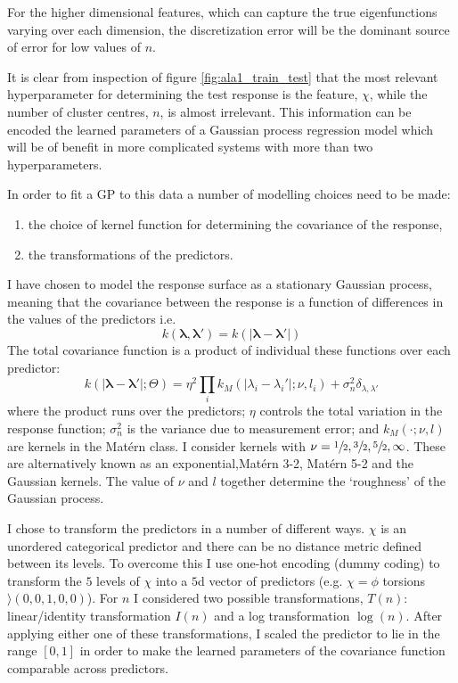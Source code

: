 For the higher dimensional features, which can capture the true eigenfunctions varying over each dimension, the discretization error will be the dominant source of error for low values of $n$. 



It is clear from inspection of figure \ref{fig:ala1_train_test} that the most relevant hyperparameter for determining the test response is the feature, $\chi$, while the number of cluster centres,  $n$, is almost irrelevant. This information can be encoded the learned parameters of a Gaussian process regression model which will be of benefit in more complicated systems with more than two hyperparameters. 

In order to fit a GP to this data a number of modelling choices need to be made: 
\begin{enumerate}
    \item the choice of kernel function for determining the covariance of the response,
    \item the transformations of the predictors.  
\end{enumerate}

I have chosen to model the response surface as a stationary Gaussian process, meaning that the covariance between the response is a function of differences in the values of the predictors i.e. 
\begin{equation}
k(\mathbf{\lambda}, \mathbf{\lambda'}) = k(|\mathbf{\lambda} - \mathbf{\lambda'}|)
\end{equation}
The total covariance function is a product of individual these functions over each predictor:
\begin{equation}\label{eqn:kernel_form}
    k(|\mathbf{\lambda}-\mathbf{\lambda}'|; \Theta) = 
    \eta^{2}\prod_i k_{M}(|\lambda_{i}-\lambda_{i}'|; \nu, l_i)
    +\sigma_{n}^{2}\delta_{\lambda, \lambda'}
\end{equation}
where  the product runs over the predictors; $\eta$ controls the total variation in the response function; $\sigma_{n}^{2}$ is the variance due to measurement error; and  $k_{M}(\cdot; \nu, l)$ are kernels in the Mat\'{e}rn class. I consider kernels with $\nu=\sfrac{1}{2},\sfrac{3}{2},\sfrac{5}{2},\infty$. These are alternatively known as an exponential,Mat\'{e}rn 3-2, Mat\'{e}rn 5-2 and the Gaussian kernels. The value of $\nu$ and $l$ together determine the `roughness' of the Gaussian process. 

I chose to transform the predictors in a number of different ways. $\chi$ is an unordered categorical predictor and there can be no distance metric defined between its levels. To overcome this I use one-hot encoding (dummy coding) to transform the $5$ levels of $\chi$ into a $5$d vector of predictors (e.g. $\chi = \phi$ torsions $\rangle (0, 0, 1, 0, 0)$).  For $n$ I considered two possible transformations, $T(n)$: linear/identity transformation $I(n)$ and a log transformation $\log{(n)}$. After applying either one of these transformations, I scaled the predictor to lie in the range $[0, 1]$ in order to make the learned parameters of the covariance function comparable across predictors. 

